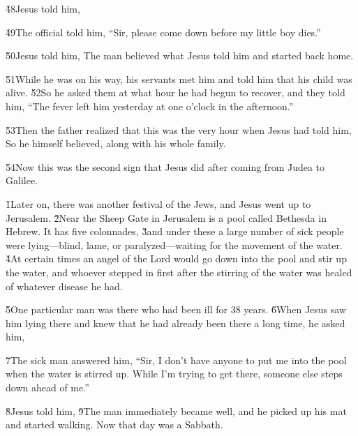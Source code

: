 \v{48}Jesus told him, 

\v{49}The official told him, ``Sir, please come down before my little boy dies.''

\v{50}Jesus told him,  The man believed what Jesus told him and started back home.

\v{51}While he was on his way, his servants met him and told him that his child was alive. \v{52}So he asked them at what hour he had begun to recover, and they told him, ``The fever left him yesterday at one o'clock in the afternoon.''

\v{53}Then the father realized that this was the very hour when Jesus had told him,  So he himself believed, along with his whole family.

\v{54}Now this was the second sign that Jesus did after coming from Judea to Galilee.

\v{1}Later on, there was another festival of the Jews, and Jesus went up to Jerusalem. \v{2}Near the Sheep Gate in Jerusalem is a pool called Bethesda in Hebrew. It has five colonnades, \v{3}and under these a large number of sick people were lying---blind, lame, or paralyzed---waiting for the movement of the water. \v{4}At certain times an angel of the Lord would go down into the pool and stir up the water, and whoever stepped in first after the stirring of the water was healed of whatever disease he had.

\v{5}One particular man was there who had been ill for 38 years. \v{6}When Jesus saw him lying there and knew that he had already been there a long time, he asked him, 

\v{7}The sick man answered him, ``Sir, I don't have anyone to put me into the pool when the water is stirred up. While I'm trying to get there, someone else steps down ahead of me.''

\v{8}Jesus told him,  \v{9}The man immediately became well, and he picked up his mat and started walking. Now that day was a Sabbath.

